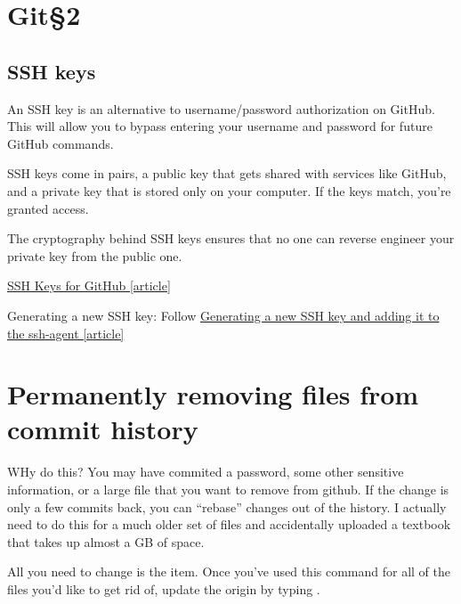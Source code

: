 \section{Git\S 2}

\subsection{SSH keys}

An SSH key is an alternative to username/password authorization on GitHub. This will allow you to bypass entering your username and password for future GitHub commands.


SSH keys come in pairs, a public key that gets shared with services like GitHub, and a private key that is stored only on your computer. If the keys match, you're granted access.

The cryptography behind SSH keys ensures that no one can reverse engineer your private key from the public one.

\href{https://jdblischak.github.io/2014-09-18-chicago/novice/git/05-sshkeys.html}{SSH Keys for GitHub [article]}

Generating a new SSH key: Follow \href{https://docs.github.com/en/free-pro-team@latest/github/authenticating-to-github/generating-a-new-ssh-key-and-adding-it-to-the-ssh-agent}{Generating a new SSH key and adding it to the ssh-agent [article]}


\section{Permanently removing files from commit history}

WHy do this? You may have commited a password, some other sensitive information, or a large file that you want to remove from github. If the change is only a few commits back, you can 	``rebase'' changes out of the history. I actually need to do this for a much older set of files and accidentally uploaded a textbook that takes up almost a GB of space. 


All you need to change is the  item. Once you've used this command for all of the files you'd like to get rid of, update the origin by typing . 

